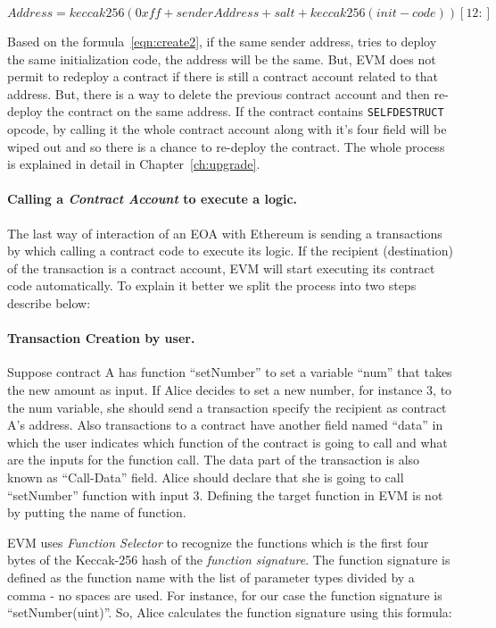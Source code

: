 \begin{equation}
    \label{eqn:create2}
    Address = keccak256(0xff + senderAddress + salt + keccak256(init-code))[12:]    
\end{equation}

Based on the formula~\ref{eqn:create2}, if the same sender address, tries to deploy the same initialization code, the address will be the same. But, EVM does not permit to redeploy a contract if there is still a contract account related to that address. But, there is a way to delete the previous contract account and then re-deploy the contract on the same address. If the contract contains \texttt{SELFDESTRUCT} opcode, by calling it the whole contract account along with it's four field will be wiped out and so there is a chance to re-deploy the contract. The whole process is explained in detail in Chapter~\ref{ch:upgrade}. 

\paragraph{Calling a \textit{Contract Account} to execute a logic.}
The last way of interaction of an EOA with Ethereum is sending a transactions by which calling a contract code to execute its logic. If the recipient (destination) of the transaction is a contract account, EVM will start executing its contract code automatically. To explain it better we split the process into two steps describe below:

\paragraph{Transaction Creation by user. }Suppose contract A has function ``setNumber'' to set a variable ``num'' that takes the new amount as input. If Alice decides to set a new number, for instance 3, to the num variable, she should send a transaction specify the recipient as contract A's address. Also transactions to a contract have another field named ``data'' in which the user indicates which function of the contract is going to call and what are the inputs for the function call. The data part of the transaction is also known as ``Call-Data'' field. Alice should declare that she is going to call ``setNumber'' function with input 3. Defining the target function in EVM is not by putting the name of function. 

EVM uses \textit{Function Selector} to recognize the functions which is the first four bytes of the Keccak-256 hash of the \textit{function signature}. The function signature is defined as the function name with the list of parameter types divided by a comma - no spaces are used. For instance, for our case the function signature is ``setNumber(uint)''. So, Alice calculates the function signature using this formula:

